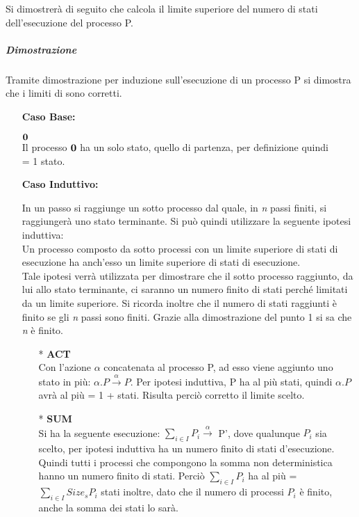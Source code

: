 Si dimostrerà di seguito che  calcola il limite superiore del numero di stati dell'esecuzione del processo P.

\subparagraph{Dimostrazione} \mbox{}

Tramite dimostrazione per induzione sull'esecuzione di un processo P si dimostra che i limiti di  sono corretti.

\begin{itemize}
	\item[] \textbf{Caso Base:} \mbox{}
	
	 $\mathbf{0}$
	\\
	Il processo $\mathbf{0}$ ha un solo stato, quello di partenza, per definizione quindi\\ \sis{\zero} = 1 stato.
		\\
	\item[] \textbf{Caso Induttivo:} \mbox{}
	
	In un passo si raggiunge un sotto processo dal quale, in \textit{n} passi finiti, si raggiungerà uno stato terminante. Si può quindi utilizzare la seguente ipotesi induttiva: \\
	Un processo composto da sotto processi con un limite superiore di stati di esecuzione ha anch'esso un limite superiore di stati di esecuzione.\\
	Tale ipotesi verrà utilizzata per dimostrare che il sotto processo raggiunto, da lui allo stato terminante, ci saranno un numero finito di stati perché limitati da un limite superiore. Si ricorda inoltre che il numero di stati raggiunti è finito se gli \textit{n} passi sono finiti. Grazie alla dimostrazione del punto 1 si sa che \textit{n} è finito. 
	\\
	\begin{itemize}
		
		\item[*] \textbf{ACT}
		\\
		Con l'azione $\alpha$ concatenata al processo P, ad esso viene aggiunto uno stato in più: $\alpha.P \overset{\alpha}\rightarrow P$. Per ipotesi induttiva, P ha al più  stati, quindi $\alpha.P$ avrà al più  = 1 +  stati. Risulta perciò corretto il limite scelto.
		\\
		\item[*] \textbf{SUM}
		\\
		Si ha la seguente esecuzione: $\displaystyle\sum_{i\in I}^{}P_{i} \overset{\alpha}\rightarrow$ P', dove qualunque $P_{i}$ sia scelto, per ipotesi induttiva ha un numero finito di stati d'esecuzione. Quindi tutti i processi che compongono la somma non deterministica hanno un numero finito di stati.
		Perciò $\displaystyle\sum_{i\in I}^{}P_{i}$ ha al più  = $\displaystyle\sum_{i\in I}^{}Size_{s}{P_{i}}$ stati inoltre, dato che il numero di processi $P_{i}$ è finito, anche la somma dei stati lo sarà.
		

\end{itemize}
\end{itemize}
